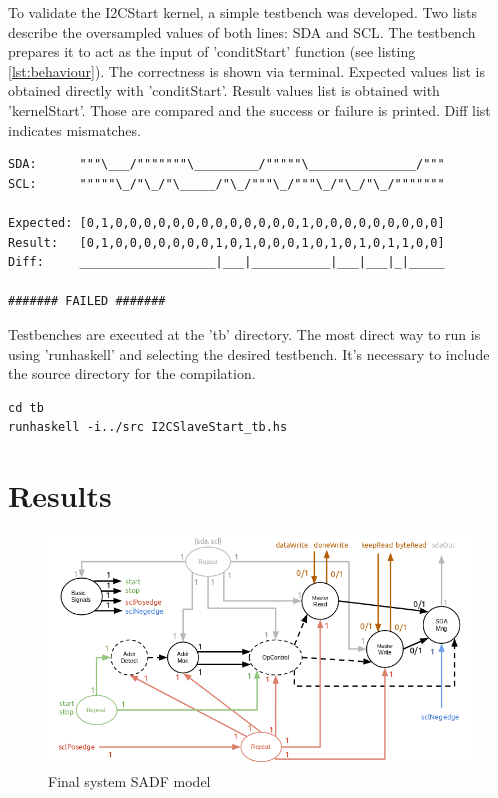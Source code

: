 \documentclass{article}
\begin{document}
To validate the I2CStart kernel, a simple testbench was developed. Two lists describe the oversampled values of both lines: SDA and SCL. The testbench prepares it to act as the input of 'conditStart' function (see listing \ref{lst:behaviour}).
The correctness is shown via terminal. Expected values list is obtained directly with 'conditStart'. Result values list is obtained with 'kernelStart'. Those are compared and the success or failure is printed. Diff list indicates mismatches.

\begin{lstlisting}[frame=single, basicstyle=\small, caption={I2CSlaveStart\_tb failure screen example}, captionpos=b]
SDA:      """\___/"""""""\_________/"""""\_______________/"""
SCL:      """""\_/"\_/"\_____/"\_/"""\_/"""\_/"\_/"\_/"""""""

Expected: [0,1,0,0,0,0,0,0,0,0,0,0,0,0,0,1,0,0,0,0,0,0,0,0,0]
Result:   [0,1,0,0,0,0,0,0,0,1,0,1,0,0,0,1,0,1,0,1,0,1,1,0,0]
Diff:     ___________________|___|___________|___|___|_|_____

####### FAILED #######
\end{lstlisting}

Testbenches are executed at the 'tb' directory. The most direct way to run is using 'runhaskell' and selecting the desired testbench. It's necessary to include the source directory for the compilation.

\begin{lstlisting}[frame=single, basicstyle=\small, caption={How to run testbench}, captionpos=b]
cd tb
runhaskell -i../src I2CSlaveStart_tb.hs
\end{lstlisting}


\section{Results} \label{sec:resul}

\begin{figure}
  \includegraphics[width=\linewidth]{img/block_full.png}
  \caption{Final system SADF model}
  \label{fig:block_full}
\end{figure}
\end{document}
